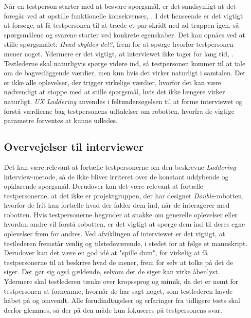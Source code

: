 
Når en testperson starter med at besvare spørgsmål, er det sandsynligt at det foregår ved at opstille funktionelle konsekvenser, \parencite[s. 3]{PDF:LadderingTheUserExperience}. I det henseende er det vigtigt at forsøge, at få testpersonen til at træde et par skridt ned ad trappen igen, så spørgsmålene og svarene starter ved konkrete egenskaber. Det kan opnåes ved at stille spørgsmålet: \textit{Hvad skyldes det?}, frem for at spørge hvorfor testpersonen mener noget. Ydermere er det vigtigt, at interviewet ikke tager for lang tid, \parencite[s. 4]{PDF:LadderingTheUserExperience}. Testlederne skal naturligvis spørge videre ind, så testpersonen kommer til at tale om de bagvedliggende værdier, men kun hvis det virker naturligt i samtalen. Det er ikke alle oplevelser, der trigger virkelige værdier, hvorfor det kan være nødvendigt at stoppe med at stille spørgsmål, hvis det ikke længere virker naturligt. \blankline
%
\textit{UX Laddering} anvendes i feltundersøgelsen til at forme interviewet og forstå værdierne bag testpersonens udtalelser om robotten, hvorfra de vigtige parametre forventes at kunne udledes.

\subsection{Overvejelser til interviewer}
\label{ParametreOvervejelserTestleder}
%
Det kan være relevant at fortælle testpersonerne om den beskrevne \textit{Laddering} interview-metode, så de ikke bliver irriteret over de konstant uddybende og opklarende spørgsmål. Derudover kan det være relevant at fortælle testpersonerne, at det ikke er projektgruppen, der har designet \textit{Double}-robotten, hvorfor de frit kan fortælle hvad der falder dem ind, når de interagerer med robotten. Hvis testpersonerne begynder at snakke om generelle oplevelser eller hvordan andre vil forstå robotten, er det vigtigt at spørge dem ind til deres egne oplevelser frem for andres. \blankline
%
Ved afviklingen af interviewet er det vigtigt, at testlederen fremstår venlig og tilstedeværende, i stedet for at følge et manuskript. Derudover kan det være en god idé at "spille dum", for virkelig at få testpersonerne til at beskrive hvad de mener, frem for selv at tolke på det de siger. Det gør sig også gældende, selvom det de siger kan virke åbenlyst. Ydermere skal testlederen tænke over kropssprog og mimik, da det er nemt for testpersonen at fornemme, hvornår de har sagt noget, som testlederen havde håbet på og omvendt. Alle forudindtagelser og erfaringer fra tidligere tests skal derfor glemmes, så der på den måde kun fokuseres på testpersonens svar. 

